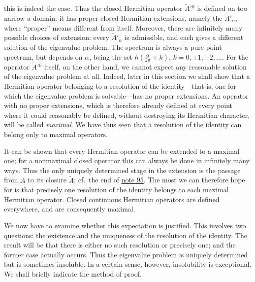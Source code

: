 \documentclass[fontsize=13pt,twoside,openany,headings=normal,parskip=false,bookmarkpackage=false,DIV=calc]{scrbook}
\begin{document}
this is indeed the case. Thus the closed Hermitian operator $\widetilde A'{}^0$ is defined on too narrow a domain: it has proper closed Hermitian extensions, namely the $\widetilde A'_\alpha$, where ``proper'' means different from itself. Moreover, there are infinitely many possible choices of extension: every $\widetilde A'_\alpha$ is admissible, and each gives a different solution of the eigenvalue problem. The spectrum is always a pure point spectrum, but depends on $\alpha$, being the set $h(\frac{\alpha}{2\pi}+k)$, $k=0,\pm1,\pm2,\ldots$. For the operator $\widetilde A'{}^0$ itself, on the other hand, we cannot expect any reasonable solution of the eigenvalue problem at all. Indeed, later in this section we shall show that a Hermitian operator belonging to a resolution of the identity---that is, one for which the eigenvalue problem is solvable---has no proper extensions. An operator with no proper extensions, which is therefore already defined at every point where it could reasonably be defined, without destroying its Hermitian character, will be called \emph{maximal}. We have thus seen that a resolution of the identity can belong only to maximal operators.

\hypertarget{origpage-80}{}%
It can be shown that every Hermitian operator can be extended to a maximal one; for a nonmaximal closed operator this can always be done in infinitely many ways. Thus the only uniquely determined stage in the extension is the passage from $A$ to its closure $\widetilde A$; cf.\ the end of \hyperlink{note-95}{note 95}. The most we can therefore hope for is that precisely one resolution of the identity belongs to each maximal Hermitian operator. Closed continuous Hermitian operators are defined everywhere, and are consequently maximal.

We now have to examine whether this expectation is justified. This involves two questions: the existence and the uniqueness of the resolution of the identity. The result will be that there is either no such resolution or precisely one; and the former case actually occurs. Thus the eigenvalue problem is uniquely determined but is sometimes insoluble. In a certain sense, however, insolubility is exceptional. We shall briefly indicate the method of proof.
\end{document}

